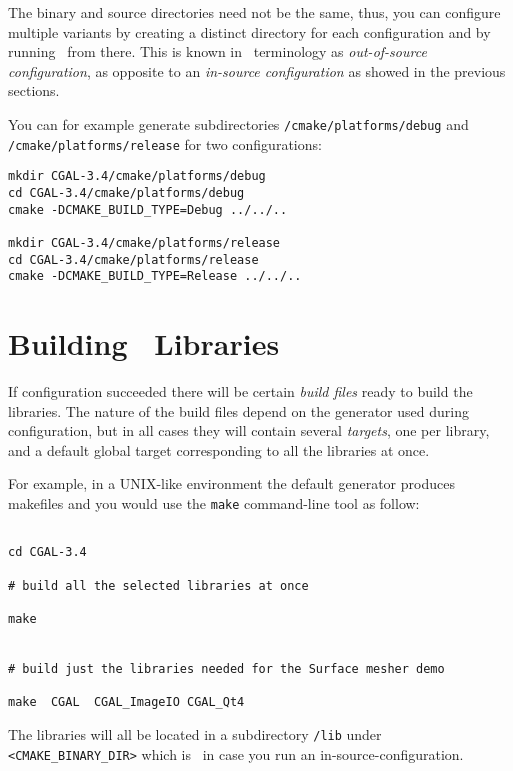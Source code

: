The binary and source directories need not be the same, thus, you can configure multiple variants by creating a
distinct directory for each configuration and by running \cmake\ from there. This is known in \cmake\ terminology
as  {\em out-of-source configuration}, as opposite to an {\em in-source configuration} as showed in the 
previous sections.

You can for example generate subdirectories \cgaldir{}\texttt{/cmake/platforms/debug} and 
\cgaldir{}\texttt{/cmake/platforms/release} for two configurations:

{\ccTexHtml{\scriptsize}{}
\begin{verbatim}
mkdir CGAL-3.4/cmake/platforms/debug
cd CGAL-3.4/cmake/platforms/debug
cmake -DCMAKE_BUILD_TYPE=Debug ../../..

mkdir CGAL-3.4/cmake/platforms/release
cd CGAL-3.4/cmake/platforms/release
cmake -DCMAKE_BUILD_TYPE=Release ../../..
\end{verbatim}
}

\section{Building \cgal\ Libraries}

If configuration succeeded there will be certain {\em build files} ready to build the libraries.
The nature of the build files depend on the generator used during configuration, but in all cases they 
will contain several {\em targets}, one per library,  and a default global target corresponding 
to all the libraries at once.

For example, in a UNIX-like environment the default generator produces makefiles and you would
use the \texttt{make} command-line tool as follow:

{\ccTexHtml{\scriptsize}{}
\begin{verbatim}

cd CGAL-3.4

# build all the selected libraries at once

make 


# build just the libraries needed for the Surface mesher demo

make  CGAL  CGAL_ImageIO CGAL_Qt4

\end{verbatim}
}

The libraries will all be located in a subdirectory {\tt /lib} under {\tt <CMAKE\_BINARY\_DIR>}
which is \cgaldir\ in case you run an in-source-configuration.

